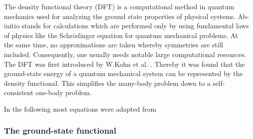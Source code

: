 	The density functional theory (DFT) is a computational method in quantum mechanics used for analyzing the ground state properties of physical systems. 
	Ab-initio stands for calculations which are performed only by using fundamental laws of physics like the Schrödinger equation for quantum mechanical problems. At the same time, no approximations are taken whereby symmetries are still included. Consequently, one usually needs notable large computational resources.
	The DFT was first introduced by W.Kohn et al. \cite{Kohn}. Thereby it was found that the ground-state energy of a quantum mechanical system can be represented by the density functional. This simplifies the many-body problem down to a self-consistent one-body problem.  
	
	In the following most equations were adapted from \cite{solid_state_book}
	\subsubsection{The ground-state functional}
	

